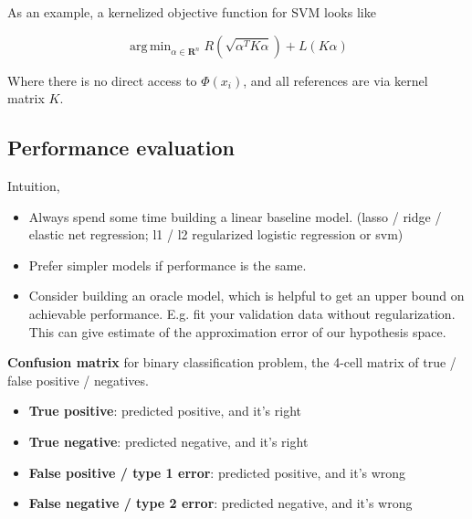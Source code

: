 \documentclass{article}
\DeclareMathOperator*{\argmin}{arg\,min}
\begin{document}
As an example, a kernelized objective function for SVM looks like

$$
\argmin_{\alpha \in \mathbf{R}^n} R(\sqrt{\alpha^T K \alpha}) + L(K \alpha)
$$

Where there is no direct access to $\Phi(x_i)$, and all references are via kernel matrix $K$.


\subsection{Performance evaluation}

Intuition,
\begin{itemize}
\item Always spend some time building a linear baseline model. (lasso / ridge / elastic net regression; l1 / l2 regularized logistic regression or svm)
\item Prefer simpler models if performance is the same.
\item Consider building an oracle model, which is helpful to get an upper bound on achievable performance. E.g. fit your validation data without regularization. This can give estimate of the approximation error of our hypothesis space.
\end{itemize}

\textbf{Confusion matrix} for binary classification problem, the 4-cell matrix of true / false positive / negatives.

\begin{itemize}
\item \textbf{True positive}: predicted positive, and it's right
\item \textbf{True negative}: predicted negative, and it's right
\item \textbf{False positive / type 1 error}: predicted positive, and it's wrong
\item \textbf{False negative / type 2 error}: predicted negative, and it's wrong
\end{itemize}
\end{document}
